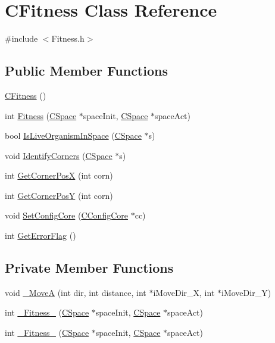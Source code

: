 \hypertarget{classCFitness}{
\section{CFitness Class Reference}
\label{classCFitness}
}


{\ttfamily \#include $<$Fitness.h$>$}\subsection*{Public Member Functions}
\begin{DoxyCompactItemize}
\item 
\hyperlink{classCFitness_a8d4721645167435856bb00ed4d5406e2}{CFitness} ()
\item 
int \hyperlink{classCFitness_a0f4e219fd31fab1f3a90baf4101ab133}{Fitness} (\hyperlink{classCSpace}{CSpace} $\ast$spaceInit, \hyperlink{classCSpace}{CSpace} $\ast$spaceAct)
\item 
bool \hyperlink{classCFitness_a73dc0cc2da0fdceaf0901ffcbf2c95ab}{IsLiveOrganismInSpace} (\hyperlink{classCSpace}{CSpace} $\ast$s)
\item 
void \hyperlink{classCFitness_ab47bde2acae9b2cf350b3f0f30c1848e}{IdentifyCorners} (\hyperlink{classCSpace}{CSpace} $\ast$s)
\item 
int \hyperlink{classCFitness_aad8f7c73a77d92e961675974d1547be1}{GetCornerPosX} (int corn)
\item 
int \hyperlink{classCFitness_af6cce0883c44254ff4f99ac82c657702}{GetCornerPosY} (int corn)
\item 
void \hyperlink{classCFitness_a6843fde3ca6128f399ed79fb222ff631}{SetConfigCore} (\hyperlink{classCConfigCore}{CConfigCore} $\ast$cc)
\item 
int \hyperlink{classCFitness_ae1b8b88c462be88750ee3ac66050f00d}{GetErrorFlag} ()
\end{DoxyCompactItemize}
\subsection*{Private Member Functions}
\begin{DoxyCompactItemize}
\item 
void \hyperlink{classCFitness_aa499673546171eaac6a42ddcfa59b808}{\_\-MoveA} (int dir, int distance, int $\ast$iMoveDir\_\-X, int $\ast$iMoveDir\_\-Y)
\item 
int \hyperlink{classCFitness_ac4244e0b5c5da3831630c7f8d77b80c4}{\_\-Fitness\_} (\hyperlink{classCSpace}{CSpace} $\ast$spaceInit, \hyperlink{classCSpace}{CSpace} $\ast$spaceAct)
\item 
int \hyperlink{classCFitness_ad6e3f11b3b29abcc1f87b93ae0584777}{\_\-Fitness\_} (\hyperlink{classCSpace}{CSpace} $\ast$spaceInit, \hyperlink{classCSpace}{CSpace} $\ast$spaceAct)
\end{DoxyCompactItemize}
